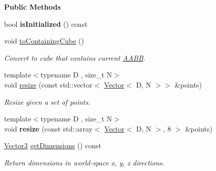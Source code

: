 \begin{Indent}\textbf{ Public Methods}\par
\begin{DoxyCompactItemize}
\item 
\mbox{\label{structrev_1_1_a_a_b_b_data_aeb5289343f9fce6c9a5704890c80f168}} 
bool {\bfseries is\+Initialized} () const
\item 
\mbox{\label{structrev_1_1_a_a_b_b_data_ab098bc3d638d3ff3ecbcf88931843f8b}} 
void \mbox{\hyperlink{structrev_1_1_a_a_b_b_data_ab098bc3d638d3ff3ecbcf88931843f8b}{to\+Containing\+Cube}} ()
\begin{DoxyCompactList}\small\item\em Convert to cube that contains current \mbox{\hyperlink{classrev_1_1_a_a_b_b}{A\+A\+BB}}. \end{DoxyCompactList}\item 
\mbox{\label{structrev_1_1_a_a_b_b_data_a942a1ff3ddbadeffe2bff1feecb7e64e}} 
{\footnotesize template$<$typename D , size\+\_\+t N$>$ }\\void \mbox{\hyperlink{structrev_1_1_a_a_b_b_data_a942a1ff3ddbadeffe2bff1feecb7e64e}{resize}} (const std\+::vector$<$ \mbox{\hyperlink{classrev_1_1_vector}{Vector}}$<$ D, N $>$$>$ \&points)
\begin{DoxyCompactList}\small\item\em Resize given a set of points. \end{DoxyCompactList}\item 
\mbox{\label{structrev_1_1_a_a_b_b_data_a68d4ed7319e7c102de167a45e7a06af9}} 
{\footnotesize template$<$typename D , size\+\_\+t N$>$ }\\void {\bfseries resize} (const std\+::array$<$ \mbox{\hyperlink{classrev_1_1_vector}{Vector}}$<$ D, N $>$, 8 $>$ \&points)
\item 
\mbox{\label{structrev_1_1_a_a_b_b_data_a037bff875ab1cda4f99b3f18c4280018}} 
\mbox{\hyperlink{classrev_1_1_vector}{Vector3}} \mbox{\hyperlink{structrev_1_1_a_a_b_b_data_a037bff875ab1cda4f99b3f18c4280018}{get\+Dimensions}} () const
\begin{DoxyCompactList}\small\item\em Return dimensions in world-\/space x, y, z directions. \end{DoxyCompactList}\item 
$$
\end{DoxyCompactItemize}
\end{Indent}
